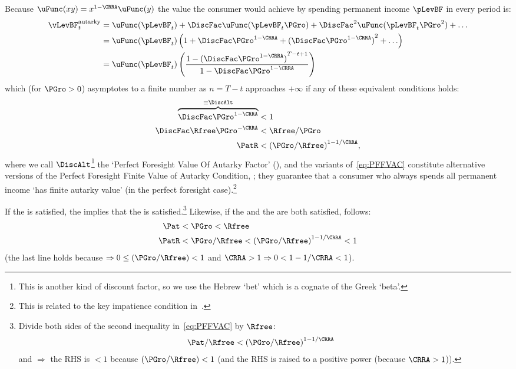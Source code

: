\documentclass[BufferStockTheory]{subfiles}
\begin{document}
Because $\uFunc(xy) = x^{1-\CRRA}\uFunc(y)$ the value the consumer would achieve by spending permanent income $\pLevBF$ in every period is:
\begin{align}
  \vLevBF_{t}^{\text{autarky}}  & = \uFunc(\pLevBF_{t})+\DiscFac \uFunc(\pLevBF_{t}\PGro)+\DiscFac^{2} \uFunc(\pLevBF_{t} \PGro^{2})+\ldots \label{eq:ValuePFAnalyticalAutarky}
  \\  & = \uFunc(\pLevBF_{t})\left(1+\DiscFac \PGro^{1-\CRRA}+{(\DiscFac \PGro^{1-\CRRA})}^{2}+\ldots\right) \notag
  \\  & = \uFunc(\pLevBF_{t})\left(\frac{1-{(\DiscFac \PGro^{1-\CRRA})}^{T-t+1}}{1-\DiscFac \PGro^{1-\CRRA}}\right) \notag
\end{align}
which (for $\PGro>0$) asymptotes to a finite number as $n=T-t$ approaches $+\infty$ if any of these equivalent conditions holds:
\begin{align}
  \overbrace{\DiscFac \PGro^{1-\CRRA} }^{\equiv \DiscAlt}  & < 1  \nonumber
  \\ \DiscFac \Rfree \PGro^{-\CRRA}  & < \Rfree/\PGro \label{eq:PFFVAC}
  \\ \PatR    & < {(\PGro/\Rfree)}^{1-1/\CRRA},  \nonumber
\end{align}
where we call $\DiscAlt$\footnote{This is another kind of discount factor, so we use the Hebrew `bet' which is a cognate of the Greek `beta'.} the `Perfect Foresight Value Of Autarky Factor' ({\PFVAF}), and the variants of~\eqref{eq:PFFVAC} constitute alternative versions of the Perfect Foresight Finite Value of Autarky Condition, \PFFVAC; they guarantee that a consumer who always spends all permanent income `has finite autarky value'  (in the perfect foresight case).\footnote{This is related to the key impatience condition in~\cite{asHomogeneous}.} %

If the {\FHWC} is satisfied, the {\PFFVAC} implies that the {\RIC} is satisfied.\footnote{Divide both sides of the second inequality in~\eqref{eq:PFFVAC} by $\Rfree$:
\begin{align}
   \Pat/\Rfree & < {(\PGro/\Rfree)}^{1-1/\CRRA}  \label{eq:FHWCandPFFVACimplyRIC}
\end{align}
and {\FHWC} $\Rightarrow$ the RHS is $< 1$ because $(\PGro/\Rfree) < 1$ (and the RHS is raised to a positive power (because $\CRRA>1$)).}  Likewise, if the {\FHWC} and the {\GIC} are both satisfied, {\PFFVAC} follows:
\begin{align}
 \Pat & < \PGro < \Rfree \notag
\\   \PatR & < \PGro/\Rfree < {(\PGro/\Rfree)}^{1-1/\CRRA} < 1\label{eq:GICandFHWCimplyPFFVAC}
\end{align}
(the last line holds because {\FHWC} $\Rightarrow 0 \leq (\PGro/\Rfree) < 1$ and $\CRRA > 1 \Rightarrow 0 < 1-1/\CRRA < 1$).
\end{document}
